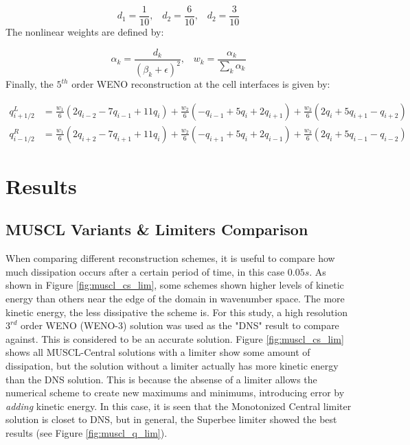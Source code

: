 \documentclass[conf]{new-aiaa}
\begin{document}
\begin{equation}
	d_1 = \frac{1}{10} \textit{,} \quad
	d_2 = \frac{6}{10} \textit{,} \quad
	d_2 = \frac{3}{10}
\end{equation}
The nonlinear weights are defined by:

\begin{equation}
	\alpha_k = \frac{d_k}{(\beta_k + \epsilon)^2} \textit{,} \quad
	w_k = \frac{\alpha_k}{\sum_k \alpha_k}
\end{equation}
Finally, the $5^{th}$ order WENO reconstruction at the cell interfaces is given
by:

\begin{equation}
\begin{aligned}
	q_{i+1/2}^L &= \frac{w_1}{6}(2q_{i-2} - 7q_{i-1} + 11q_i) +
	               \frac{w_2}{6}(-q_{i-1} + 5q_i + 2q_{i+1}) +
				   \frac{w_3}{6}(2q_i + 5q_{i+1} - q_{i+2}) \\
	q_{i-1/2}^R &= \frac{w_1}{6}(2q_{i+2} - 7q_{i+1} + 11q_i) +
	               \frac{w_2}{6}(-q_{i+1} + 5q_i + 2q_{i-1}) +
				   \frac{w_3}{6}(2q_i + 5q_{i-1} - q_{i-2})
\end{aligned}
\end{equation}


\section{Results}

\subsection{MUSCL Variants \& Limiters Comparison}
When comparing different reconstruction schemes, it is useful to compare how
much dissipation occurs after a certain period of time, in this case $0.05s$.
As shown in Figure \ref{fig:muscl_cs_lim}, some schemes shown higher levels of
kinetic energy than others near the edge of the domain in wavenumber space. The
more kinetic energy, the less dissipative the scheme is. For this study, a high
resolution $3^{rd}$ order WENO (WENO-3) solution was used as the "DNS" result
to compare against. This is considered to be an accurate solution. Figure
\ref{fig:muscl_cs_lim} shows all MUSCL-Central solutions with a limiter show
some amount of dissipation, but the solution without a limiter actually has
more kinetic energy than the DNS solution. This is because the absense of a
limiter allows the numerical scheme to create new maximums and minimums,
introducing error by \textit{adding} kinetic energy. In this case, it is seen
that the Monotonized Central limiter solution is closet to DNS, but in general,
the Superbee limiter showed the best results (see Figure
\ref{fig:muscl_q_lim}).
\end{document}
